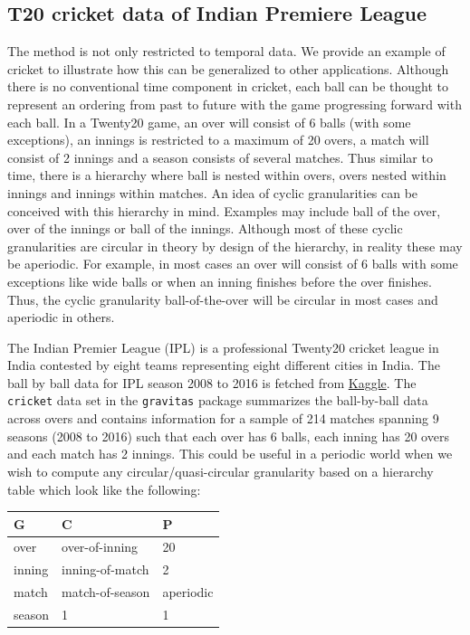 \documentclass[12pt]{article}
\begin{document}
\hypertarget{sec:cricket}{%
\subsection{T20 cricket data of Indian Premiere League}\label{sec:cricket}}

The method is not only restricted to temporal data. We provide an example of cricket to illustrate how this can be generalized to other applications. Although there is no conventional time component in cricket, each ball can be thought to represent an ordering from past to future with the game progressing forward with each ball. In a Twenty20 game, an over will consist of 6 balls (with some exceptions), an innings is restricted to a maximum of 20 overs, a match will consist of 2 innings and a season consists of several matches. Thus similar to time, there is a hierarchy where ball is nested within overs, overs nested within innings and innings within matches. An idea of cyclic granularities can be conceived with this hierarchy in mind. Examples may include ball of the over, over of the innings or ball of the innings. Although most of these cyclic granularities are circular in theory by design of the hierarchy, in reality these may be aperiodic. For example, in most cases an over will consist of 6 balls with some exceptions like wide balls or when an inning finishes before the over finishes. Thus, the cyclic granularity ball-of-the-over will be circular in most cases and aperiodic in others.

The Indian Premier League (IPL) is a professional Twenty20 cricket league in India contested by eight teams representing eight different cities in India. The ball by ball data for IPL season 2008 to 2016 is fetched from \href{https://www.kaggle.com/josephgpinto/ipl-data-analysis/data}{Kaggle}. The \texttt{cricket} data set in the \texttt{gravitas} package summarizes the ball-by-ball data across overs and contains information for a sample of 214 matches spanning 9 seasons (2008 to 2016) such that each over has 6 balls, each inning has 20 overs and each match has 2 innings. This could be useful in a periodic world when we wish to compute any circular/quasi-circular granularity based on a hierarchy table which look like the following:

\begin{longtable}[]{@{}lll@{}}
\toprule
G & C & P\tabularnewline
\midrule
\endhead
over & over-of-inning & 20\tabularnewline
inning & inning-of-match & 2\tabularnewline
match & match-of-season & aperiodic\tabularnewline
season & 1 & 1\tabularnewline
\bottomrule
\end{longtable}
\end{document}
